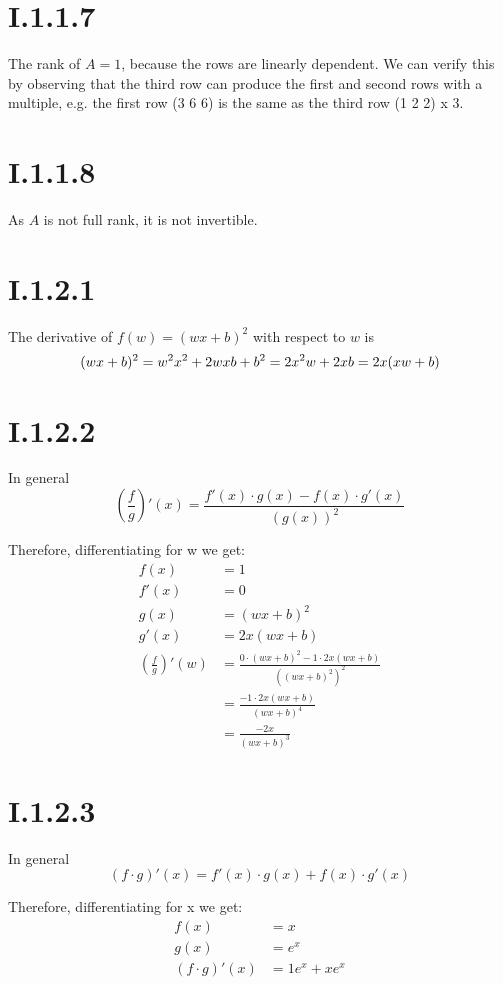 \section*{I.1.1.7}
The rank of $A = 1$, because the rows are linearly dependent. We can verify this by observing
that the third row can produce the first and second rows with a multiple, e.g. the first row (3 6 6)
is the same as the third row (1 2 2) x 3.

\section*{I.1.1.8}
As $A$ is not full rank, it is not invertible.

\section*{I.1.2.1}
The derivative of $f(w) = (wx + b)^2$ with respect to $w$ is
\[
	(wx+b)^2 = w^2 x^2 + 2wxb+b^2 = \\
	2x^2w + 2xb = \\
	2x(xw + b)
\]

\section*{I.1.2.2}
In general
\[
	\left ( \frac{f}{g} \right )' (x) = \frac{f'(x) \cdot g(x) - f(x) \cdot g'(x)}{(g(x))^2}
\]

Therefore, differentiating for w we get:
\begin{align*}
	f(x) &= 1 \\
	f'(x) &= 0 \\
	g(x) &= (wx+b)^2 \\
	g'(x) &= 2x(wx+b) \\
	\left ( \frac{f}{g} \right )' (w) &= \frac{0 \cdot (wx+b)^2 - 1 \cdot 2x(wx+b)}{((wx+b)^2)^2} \\
	&= \frac{-1 \cdot 2x(wx+b)}{(wx+b)^4} \\
	&= \frac{-2x}{(wx+b)^3}
\end{align*}

\section*{I.1.2.3}
In general
\[
	\left ( f \cdot g \right )' (x) = f'(x) \cdot g(x) + f(x) \cdot g'(x)
\]

Therefore, differentiating for x we get:
\begin{align*}
	f(x) &= x \\
	g(x) &= e^x \\
	\left ( f \cdot g \right )' (x) &= 1e^x + xe^x
\end{align*}
